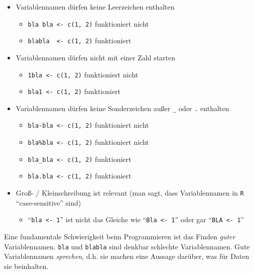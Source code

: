 \documentclass[12pt,]{tufte-book}
\providecommand{\tightlist}{%
  \setlength{\itemsep}{0pt}\setlength{\parskip}{0pt}}
\theoremstyle{definition}
\theoremstyle{definition}
\theoremstyle{definition}
\theoremstyle{remark}
\begin{document}
\begin{itemize}
\tightlist
\item
  Variablennamen dürfen keine Leerzeichen enthalten

  \begin{itemize}
  \tightlist
  \item
    \texttt{bla\ bla\ \textless{}-\ c(1,\ 2)} funktioniert nicht
  \item
    \texttt{blabla\ \ \textless{}-\ c(1,\ 2)} funktioniert
  \end{itemize}
\item
  Variablennamen dürfen nicht mit einer Zahl starten

  \begin{itemize}
  \tightlist
  \item
    \texttt{1bla\ \textless{}-\ c(1,\ 2)} funktioniert nicht
  \item
    \texttt{bla1\ \textless{}-\ c(1,\ 2)} funktioniert
  \end{itemize}
\item
  Variablennamen dürfen keine Sonderzeichen außer \texttt{\_} oder
  \texttt{.} enthalten

  \begin{itemize}
  \tightlist
  \item
    \texttt{bla-bla\ \textless{}-\ c(1,\ 2)} funktioniert nicht
  \item
    \texttt{bla\%bla\ \textless{}-\ c(1,\ 2)} funktioniert nicht
  \item
    \texttt{bla\_bla\ \textless{}-\ c(1,\ 2)} funktioniert
  \item
    \texttt{bla.bla\ \textless{}-\ c(1,\ 2)} funktioniert
  \end{itemize}
\item
  Groß- / Kleinschreibung ist relevant (man sagt, dass Variablennamen in
  \texttt{R} ``case-sensitive'' sind)

  \begin{itemize}
  \tightlist
  \item
    ``\texttt{bla\ \textless{}-\ 1}'' ist nicht das Gleiche wie
    ``\texttt{Bla\ \textless{}-\ 1}'' oder gar
    ``\texttt{BLA\ \textless{}-\ 1}''
  \end{itemize}
\end{itemize}

Eine fundamentale Schwierigkeit beim Programmieren ist das Finden
\emph{guter} Variablennamen. \texttt{bla} und \texttt{blabla} sind
denkbar schlechte Variablennamen. Gute Variablennamen \emph{sprechen},
d.h. sie machen eine Aussage darüber, was für Daten sie beinhalten.
\end{document}
